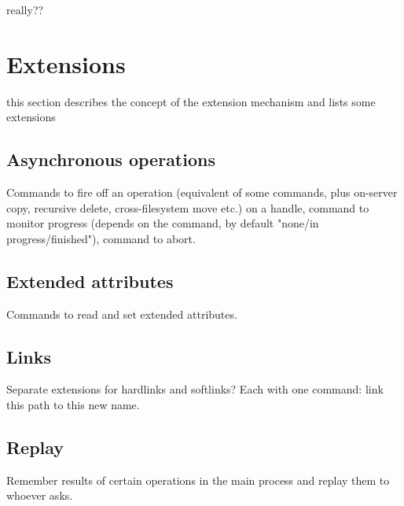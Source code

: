 really??


\section{Extensions}

this section describes the concept of the extension mechanism and lists some extensions

\subsection{Asynchronous operations}

Commands to fire off an operation (equivalent of some commands, plus on-server copy, recursive delete,
cross-filesystem move etc.) on a handle, command to monitor progress (depends on the command, by default
"none/in progress/finished"), command to abort.

\subsection{Extended attributes}

Commands to read and set extended attributes.

\subsection{Links}

Separate extensions for hardlinks and softlinks? Each with one command: link this path to this new name.

\subsection{Replay}

Remember results of certain operations in the main process and replay them to whoever asks.
